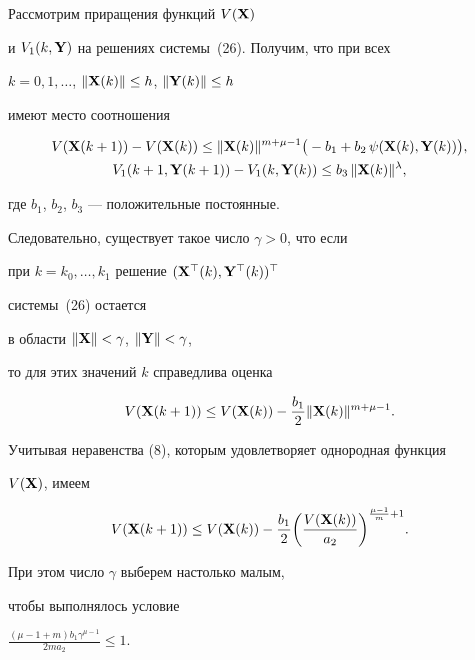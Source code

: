 \begin{pf}


Рассмотрим приращения функций $V(\bold X)$


и $V_1(k, \bold Y)$ на решениях системы~(26). Получим, что при всех


$k=0,1,\dotsc$, $\|\bold X(k)\|\leq h$, $\|\bold Y(k)\|\leq h$


имеют место соотношения


\begin{gather*}


V(\bold X(k+1))- V(\bold X(k))\leq \|\bold X(k)\|^{m+\mu-1}


\big(-b_1+b_2 \, \psi(\bold X(k),\bold Y(k))\big), \\


V_1(k+1, \bold Y(k+1)) - V_1(k, \bold Y(k))\leq b_3 \,


\|\bold X(k)\|^\lambda,


\end{gather*}


где $b_1$, $b_2$, $b_3$ --- положительные постоянные.


Следовательно, существует такое число $\gamma> 0$, что если


при $k=k_0,\dotsc,k_1$ решение $(\bold X^\top(k), \bold Y^\top(k))^\top$


системы~(26) остается


в области $\|\bold X\|< \gamma$, $\|\bold Y\|< \gamma$,


то для этих значений $k$ справедлива оценка


$$


V(\bold X(k+1))\leq V(\bold X(k))-\frac{b_1}2 \|\bold X(k)\|^{m+\mu-1}.


$$





Учитывая неравенства (8), которым удовлетворяет однородная функция


$V(\bold X)$, имеем


$$


V(\bold X(k+1))\leq V(\bold X(k))-\frac{b_1}2


\bigg(\frac{V(\bold X(k))}{a_2}\bigg)^{\frac{\mu-1}m+1}.


$$


При этом число $\gamma$ выберем настолько малым,


чтобы выполнялось условие


$\frac{(\mu-1+m) b_1 \gamma^{\mu-1}}{2 m a_2}\leq 1$.






\end{pf}

